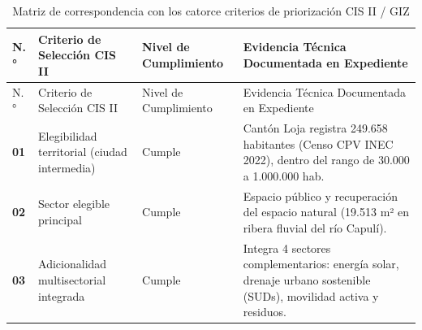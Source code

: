 \documentclass[
  spanish,
  letterpaper,
  DIV=11,
  numbers=noendperiod]{scrartcl}
\begin{document}
\begin{longtable}[]{@{}
  >{\centering\arraybackslash}p{}
  >{\raggedright\arraybackslash}p{}
  >{\centering\arraybackslash}p{}
  >{\raggedright\arraybackslash}p{}@{}}
\caption{Matriz de correspondencia con los catorce criterios de
priorización CIS II / GIZ}\label{tbl-criterios-giz}\tabularnewline
\toprule\noalign{}
\begin{minipage}[b]{\linewidth}\centering
N.°
\end{minipage} & \begin{minipage}[b]{\linewidth}\raggedright
Criterio de Selección CIS II
\end{minipage} & \begin{minipage}[b]{\linewidth}\centering
Nivel de Cumplimiento
\end{minipage} & \begin{minipage}[b]{\linewidth}\raggedright
Evidencia Técnica Documentada en Expediente
\end{minipage} \\
\midrule\noalign{}
\endfirsthead
\toprule\noalign{}
\begin{minipage}[b]{\linewidth}\centering
N.°
\end{minipage} & \begin{minipage}[b]{\linewidth}\raggedright
Criterio de Selección CIS II
\end{minipage} & \begin{minipage}[b]{\linewidth}\centering
Nivel de Cumplimiento
\end{minipage} & \begin{minipage}[b]{\linewidth}\raggedright
Evidencia Técnica Documentada en Expediente
\end{minipage} \\
\midrule\noalign{}
\endhead
\bottomrule\noalign{}
\endlastfoot
\textbf{01} & Elegibilidad territorial (ciudad intermedia) & Cumple &
Cantón Loja registra 249.658 habitantes (Censo CPV INEC 2022), dentro
del rango de 30.000 a 1.000.000 hab. \\
\textbf{02} & Sector elegible principal & Cumple & Espacio público y
recuperación del espacio natural (19.513 m² en ribera fluvial del río
Capulí). \\
\textbf{03} & Adicionalidad multisectorial integrada & Cumple & Integra
4 sectores complementarios: energía solar, drenaje urbano sostenible
(SUDs), movilidad activa y residuos. \\

\end{longtable}
\end{document}
